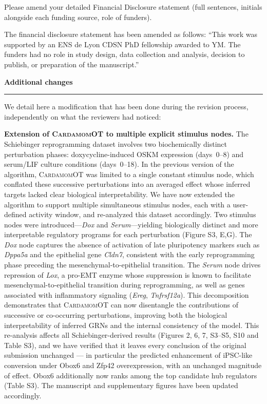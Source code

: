 \documentclass[11pt,a4paper]{article}
\newcounter{revtotal}   %
\newcounter{revlocal}   %
\newcommand{\currentreviewer}{}  %
\newcommand{\revcomment}[2]{%
  \stepcounter{revtotal}%
  \stepcounter{revlocal}%
  \edef\commentlabel{\currentreviewer.\arabic{revlocal}}%
  \begin{tcolorbox}[revstyle,
      title={\commentlabel\ $|$\ #1}]
    #2
  \end{tcolorbox}%
  \edef\lastcommentlabel{\commentlabel}%
}
\newcommand{\response}[1]{%
  \begin{tcolorbox}[respstyle,
      title={Response to \lastcommentlabel}]
    #1
  \end{tcolorbox}%
}
\renewcommand{\section}[1]{%
  \vspace{1.2em}%
  {\large\bfseries\color{secpurple} #1}\\[-0.4em]%
  {\color{secpurple}\rule{\linewidth}{0.8pt}}%
  \vspace{0.4em}%
}
\begin{document}
\revcomment{Journal Requirement --- Financial Disclosure}{%
Please amend your detailed Financial Disclosure statement (full sentences, initials
alongside each funding source, role of funders).}
\response{%
The financial disclosure statement has been amended as follows: ``This work was supported
by an ENS de Lyon CDSN PhD fellowship awarded to YM. The funders had no role in study
design, data collection and analysis, decision to publish, or preparation of the
manuscript.''}

\section{Additional changes}

\noindent We detail here a modification that has been done during the revision process, independently on what the reviewers had noticed:\par

\textbf{Extension of \textsc{CardamomOT} to multiple explicit stimulus nodes.} 
The Schiebinger reprogramming dataset involves two 
biochemically distinct perturbation phases: doxycycline-induced OSKM expression 
(days~0--8) and serum/LIF culture conditions (days~0--18). In the previous 
version of the algorithm, \textsc{CardamomOT} was limited to a single constant 
stimulus node, which conflated these successive perturbations into an averaged 
effect whose inferred targets lacked clear biological interpretability. We have 
now extended the algorithm to support multiple simultaneous stimulus nodes, each 
with a user-defined activity window, and re-analyzed this dataset accordingly. 
Two stimulus nodes were introduced---\emph{Dox} and \emph{Serum}---yielding 
biologically distinct and more interpretable regulatory programs for each 
perturbation (Figure S3, E,G). The \emph{Dox} node captures the 
absence of activation of late pluripotency markers such as \emph{Dppa5a} and 
the epithelial gene \emph{Cldn7}, consistent with the early reprogramming phase 
preceding the mesenchymal-to-epithelial transition. The \emph{Serum} node 
drives repression of \emph{Lox}, a pro-EMT enzyme whose suppression is known 
to facilitate mesenchymal-to-epithelial transition during reprogramming, as well 
as genes associated with inflammatory signaling (\emph{Ereg}, \emph{Tnfrsf12a}). 
This decomposition demonstrates that \textsc{CardamomOT} can now disentangle the 
contributions of successive or co-occurring perturbations, improving both the 
biological interpretability of inferred GRNs and the internal consistency of the 
model. 
This re-analysis affects all Schiebinger-derived results (Figures 2, 6, 7, S3–S5, S10 and Table S3), and we have verified that it leaves every conclusion of the original submission unchanged — in particular the predicted enhancement of iPSC-like conversion under Obox6 and Zfp42 overexpression, with an unchanged magnitude of effect. Obox6 additionally now ranks among the top candidate hub regulators (Table S3). The manuscript and supplementary figures have been updated accordingly.\par
\end{document}
